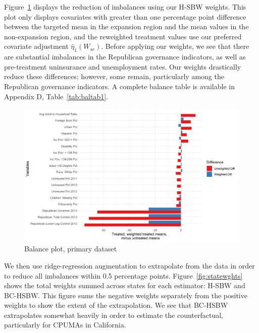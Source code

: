 Figure~\ref{fig:loveplotc1} displays the reduction of imbalances using our H-SBW weights. This plot only displays covariates with greater than one percentage point difference between the targeted mean in the expansion region and the mean values in the non-expansion region, and the reweighted treatment values use our preferred covariate adjustment $\hat{\eta}_1(W_{sc})$. Before applying our weights, we see that there are substantial imbalances in the Republican governance indicators, as well as pre-treatment uninsurance and unemployment rates. Our weights drastically reduce these differences; however, some remain, particularly among the Republican governance indicators. A complete balance table is available in Appendix D, Table~\ref{tab:baltab1}. 

\begin{figure}[H]
\begin{center}
    \caption{Balance plot, primary dataset}
    \label{fig:loveplotc1}
    \includegraphics[scale=0.6]{01_Plots/balance-plot-etuc1.png}
\end{center}
\end{figure}

We then use ridge-regression augmentation to extrapolate from the data in order to reduce all imbalances within 0.5 percentage points. Figure~\ref{fig:statewghts} shows the total weights summed across states for each estimator: H-SBW and BC-HSBW. This figure sums the negative weights separately from the positive weights to show the extent of the extrapolation. We see that BC-HSBW extrapolates somewhat heavily in order to estimate the counterfactual, particularly for CPUMAs in California. 

